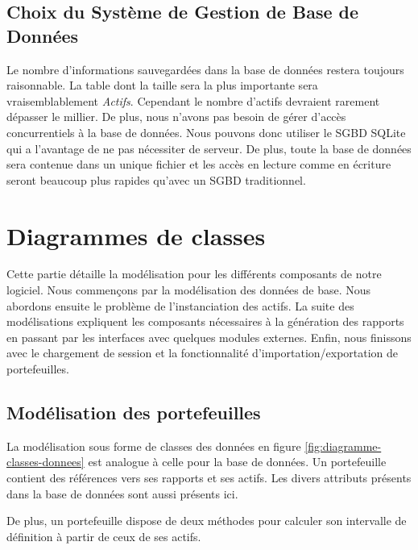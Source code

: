 \documentclass[a4paper]{report}
\begin{document}
\subsection{Choix du Système de Gestion de Base de Données}

Le nombre d'informations sauvegardées dans la base de données restera toujours raisonnable.
La table dont la taille sera la plus importante sera vraisemblablement \textit{Actifs}.
Cependant le nombre d'actifs devraient rarement dépasser le millier.
De plus, nous n'avons pas besoin de gérer d'accès concurrentiels à la base de données.
Nous pouvons donc utiliser le SGBD SQLite qui a l'avantage de ne pas nécessiter de serveur.
De plus, toute la base de données sera contenue dans un unique fichier et les accès en lecture comme en écriture seront beaucoup plus rapides qu'avec un SGBD traditionnel.


\section{Diagrammes de classes}

Cette partie détaille la modélisation pour les différents composants de notre logiciel.
Nous commençons par la modélisation des données de base. Nous abordons ensuite le problème de l'instanciation des actifs.
La suite des modélisations expliquent les composants nécessaires à la génération des rapports en passant par les interfaces avec quelques modules externes.
Enfin, nous finissons avec le chargement de session et la fonctionnalité d'importation/exportation de portefeuilles.


\subsection{Modélisation des portefeuilles}

La modélisation sous forme de classes des données en figure \ref{fig:diagramme-classes-donnees} est analogue à celle pour la base de données. Un portefeuille contient des références vers ses rapports et ses actifs. Les divers attributs présents dans la base de données sont aussi présents ici.

De plus, un portefeuille dispose de deux méthodes pour calculer son intervalle de définition à partir de ceux de ses actifs.
\end{document}
